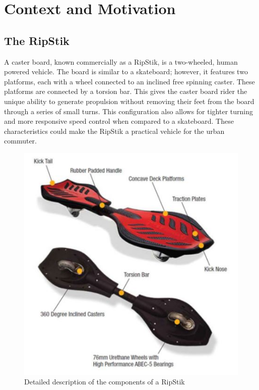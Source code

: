 \documentclass[12pt,letterpaper]{article}
\begin{document}
	
\section{Context and Motivation}

\subsection{The RipStik}
A caster board, known commercially as a RipStik, is a two-wheeled, human powered vehicle. 
The board is similar to a skateboard; however, it features two platforms, each with a wheel connected to an inclined free spinning caster. 
These platforms are connected by a torsion bar. 
This gives the caster board rider the unique ability to generate propulsion without removing their feet from the board through a series of small turns. 
This configuration also allows for tighter turning and more responsive speed control when compared to a skateboard. 
These characteristics could make the RipStik a practical vehicle for the urban commuter.
\begin{figure}[!htb]
	\centering
	\includegraphics[width=\linewidth]{RipStik.JPG}
	\caption{Detailed description of the components of a RipStik \cite{PIC}}\label{fig:RipStik}
	\endminipage
\end{figure}
\end{document}
